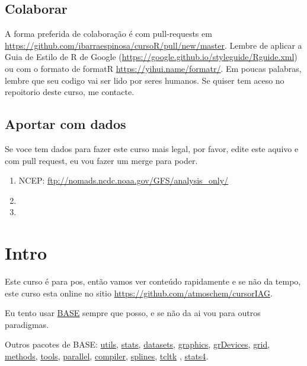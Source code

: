 \documentclass[]{book}
\theoremstyle{definition}
\theoremstyle{definition}
\theoremstyle{definition}
\theoremstyle{remark}
\begin{document}
\section{Colaborar}\label{colaborar}

A forma preferida de colaboração é com pull-requests em
\url{https://github.com/ibarraespinosa/cursoR/pull/new/master}. Lembre
de aplicar a Guia de Estilo de R de Google
(\url{https://google.github.io/styleguide/Rguide.xml}) ou com o formato
de formatR \url{https://yihui.name/formatr/}. Em poucas palabras, lembre
que seu codigo vai ser lido por seres humanos. Se quiser tem aceso no
repoitorio deste curso, me contacte.

\section{Aportar com dados}\label{aportar-com-dados}

Se voce tem dados para fazer este curso mais legal, por favor, edite
este aquivo e com pull request, eu vou fazer um merge para poder.

\begin{enumerate}
\def\labelenumi{\arabic{enumi}.}
\item
  NCEP: \url{ftp://nomads.ncdc.noaa.gov/GFS/analysis_only/}
\item
\item
\end{enumerate}

\chapter{Intro}\label{intro}

Este curso é para pos, então vamos ver conteúdo rapidamente e se não da
tempo, este curso esta online no sitio
\url{https://github.com/atmoschem/cursorIAG}.

Eu tento usar
\href{http://stat.ethz.ch/R-manual/R-devel/library/base/html/00Index.html}{BASE}
sempre que posso, e se não da ai vou para outros paradigmas.

Outros pacotes de BASE:
\href{http://stat.ethz.ch/R-manual/R-devel/library/utils/html/00Index.html}{utils},
\href{http://stat.ethz.ch/R-manual/R-devel/library/stats/html/00Index.html}{stats},
\href{http://stat.ethz.ch/R-manual/R-devel/library/datasets/html/00Index.html}{datasets},
\href{http://stat.ethz.ch/R-manual/R-devel/library/graphics/html/00Index.html}{graphics},
\href{https://stat.ethz.ch/R-manual/R-devel/library/grDevices/html/00Index.html}{grDevices},
\href{https://stat.ethz.ch/R-manual/R-devel/library/grid/html/00Index.html}{grid},
\href{https://stat.ethz.ch/R-manual/R-devel/library/methods/html/00Index.html}{methods},
\href{https://stat.ethz.ch/R-manual/R-devel/library/tools/html/00Index.html}{tools},
\href{https://stat.ethz.ch/R-manual/R-devel/library/parallel/html/00Index.html}{parallel},
\href{https://stat.ethz.ch/R-manual/R-devel/library/compiler/html/00Index.html}{compiler},
\href{https://stat.ethz.ch/R-manual/R-devel/library/splines/html/00Index.html}{splines},
\href{https://stat.ethz.ch/R-manual/R-devel/library/tcltk/html/00Index.html}{tcltk}
,
\href{https://stat.ethz.ch/R-manual/R-devel/library/stats4/html/00Index.html}{stats4}.
\end{document}
